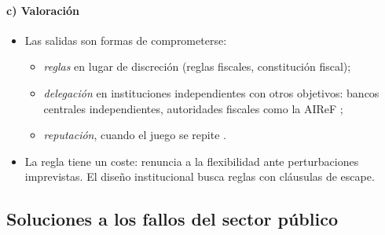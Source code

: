 \documentclass[11pt]{article}
\begin{document}
\paragraph{c) Valoración}
\begin{itemize}
\item Las salidas son formas de comprometerse:
  \begin{itemize}
  \item \emph{reglas} en lugar de discreción (reglas fiscales, constitución fiscal);
  \item \emph{delegación} en instituciones independientes con otros objetivos: bancos centrales independientes, autoridades fiscales como la AIReF ;
  \item \emph{reputación}, cuando el juego se repite .
  \end{itemize}
\item La regla tiene un coste: renuncia a la flexibilidad ante perturbaciones imprevistas. El diseño institucional busca reglas con cláusulas de escape.
\end{itemize}

\subsection{Soluciones a los fallos del sector público}\label{sec:soluciones-fallos-sp}
\end{document}

